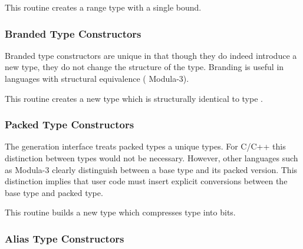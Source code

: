 \begin{functionality}
This routine creates a range type with a single bound.
\end{functionality}
\begin{functionality}
\end{functionality}

\subsubsection{Branded Type Constructors}
Branded type constructors are unique in that though they do indeed
introduce a new type, they do not change the structure of the type.
Branding is useful in languages with structural equivalence (\eg
Modula-3).
\begin{functionality}
This routine creates a new type which is structurally identical to
type .  
\end{functionality}

\subsubsection{Packed Type Constructors}
The generation interface treats packed types a unique types.  For
C/C++ this distinction between types would not be necessary.  However,
other languages such as Modula-3 clearly distinguish between a base
type and its packed version.  This distinction implies that user code
must insert explicit conversions between the base type and packed
type.

\begin{functionality}
This routine builds a new type which compresses type 
into  bits.  
\end{functionality}

\subsubsection{Alias Type Constructors}

